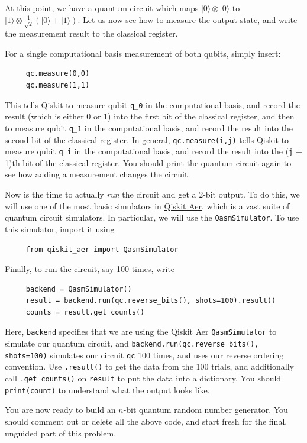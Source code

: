 \documentclass[10pt, cm]{article}
\renewcommand{\ket}[1]{|#1\rangle}		%
\begin{document}
\begin{enumerate}[(a)]
At this point, we have a quantum circuit which maps $\ket{0} \otimes \ket{0}$ to $\ket{1} \otimes \frac{1}{\sqrt{2}}\left(\ket{0} + \ket{1}\right)$. Let us now see how to measure the output state, and write the measurement result to the classical register.

For a single computational basis measurement of both qubits, simply insert:
\begin{verbatim}
     qc.measure(0,0)
     qc.measure(1,1)
\end{verbatim}
This tells Qiskit to measure qubit \texttt{q\_0} in the computational basis, and record the result (which is either 0 or 1) into the first bit of the classical register, and then to measure qubit \texttt{q\_1} in the computational basis, and record the result into the second bit of the classical register. In general, \texttt{qc.measure(i,j)} tells Qiskit to measure qubit \texttt{q\_i} in the computational basis, and record the result into the (\texttt{j} + 1)th bit of the classical register. You should print the quantum circuit again to see how adding a measurement changes the circuit. 

Now is the time to actually \emph{run} the circuit and get a 2-bit output. To do this, we will use one of the most basic simulators in \href{https://qiskit.github.io/qiskit-aer/index.html}{Qiskit Aer}, which is a vast suite of quantum circuit simulators. In particular, we will use the \texttt{QasmSimulator}. To use this simulator, import it using
\begin{verbatim}
     from qiskit_aer import QasmSimulator
\end{verbatim}
Finally, to run the circuit, say 100 times, write
\begin{verbatim}
     backend = QasmSimulator()
     result = backend.run(qc.reverse_bits(), shots=100).result()
     counts = result.get_counts()                    
\end{verbatim}
Here, \texttt{backend} specifies that we are using the Qiskit Aer \texttt{QasmSimulator} to simulate our quantum circuit, and \texttt{backend.run(qc.reverse\_bits(), shots=100)} simulates our circuit \texttt{qc} 100 times, and uses our reverse ordering convention. Use \texttt{.result()} to get the data from the 100 trials, and additionally call \texttt{.get\_counts()} on \texttt{result} to put the data into a dictionary. You should \texttt{print(count)} to understand what the output looks like.

You are now ready to build an $n$-bit quantum random number generator. You should comment out or delete all the above code, and start fresh for the final, unguided part of this problem.


\end{enumerate}
\end{document}
